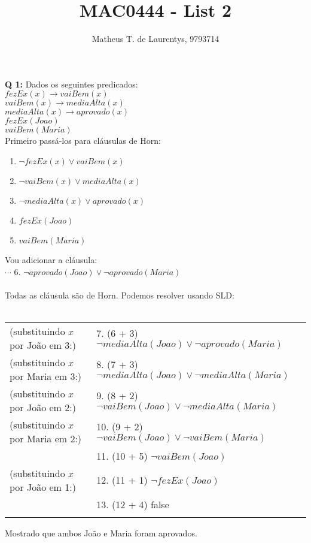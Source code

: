 \documentclass[]{article}
\title{\vspace{-4.0cm}MAC0444 - List 2}
\author{Matheus T. de Laurentys, 9793714}
\begin{document}
	\maketitle
	\noindent
	\textbf{Q 1:} Dados os seguintes predicados:\\
	$fezEx(x) \rightarrow vaiBem(x)$\\
	$vaiBem(x) \rightarrow mediaAlta(x)$\\
	$mediaAlta(x) \rightarrow aprovado(x)$\\
	$fezEx(Joao)$\\
	$vaiBem(Maria)$\\
	Primeiro passá-los para cláusulas de Horn: \\
	\begin{enumerate}
		\item $\lnot fezEx(x) \lor vaiBem(x)$
		\item $\lnot vaiBem(x) \lor mediaAlta(x)$
		\item $\lnot mediaAlta(x) \lor aprovado(x)$
		\item $fezEx(Joao)$
		\item $vaiBem(Maria)$\\
	\end{enumerate}
	Vou adicionar a cláusula:\\
	$\cdots$ 6. $\lnot aprovado(Joao) \lor \lnot aprovado(Maria)$\\\\
	Todas as cláusula são de Horn. Podemos resolver usando SLD:\\\\
	\begin{tabular} {ll}
	(substituindo $x$ por João em 3:) &7. (6 + 3) $\lnot mediaAlta(Joao) \lor \lnot aprovado(Maria)$\\
	(substituindo $x$ por Maria em 3:) &8. (7 + 3) $\lnot mediaAlta(Joao) \lor \lnot mediaAlta(Maria)$\\
	(substituindo $x$ por João em 2:) &9. (8 + 2) $\lnot vaiBem(Joao) \lor \lnot mediaAlta(Maria)$\\
	(substituindo $x$ por Maria em 2:) &10. (9 + 2) $\lnot vaiBem(Joao) \lor \lnot vaiBem(Maria)$\\
	&11. (10 + 5) $\lnot vaiBem(Joao)$\\
	(substituindo $x$ por João em 1:) &12. (11 + 1) $\lnot fezEx(Joao)$\\
	&13. (12 + 4) false\\\\
	\end{tabular}
	Mostrado que ambos João e Maria foram aprovados.\\\\
	
\end{document}
